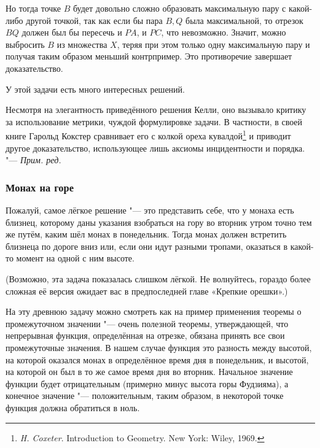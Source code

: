 \documentclass[twoside]{book}
\newenvironment{addedbytheeditors}{\par\medskip\small
}{\par\addvspace{\medskipamount}} %
\begin{document}
Но тогда точке $B$ будет довольно сложно образовать максимальную пару с какой-либо другой точкой, так как если бы пара $B,Q$ была максимальной, то отрезок $BQ$ должен был бы пересечь и $PA$, и $PC$, что невозможно.
Значит, можно выбросить $B$ из множества $X$, теряя при этом только одну максимальную пару и получая таким образом меньший контрпример.
Это противоречие завершает доказательство.\heart

\begin{addedbytheeditors}
У этой задачи есть много интересных решений.


Несмотря на элегантность приведённого решения Келли, оно вызывало
критику за использование метрики, чуждой формулировке задачи.
В
частности, в своей книге Гарольд Кокстер сравнивает его с
колкой ореха кувалдой\footnote{\emph{H. Coxeter}. Introduction to Geometry. New York: Wiley, 1969.}  и приводит другое доказательство,
использующее лишь аксиомы инцидентности и порядка.  "---
\emph{Прим. ред.}
\end{addedbytheeditors}

\subsubsection*{Монах на горе}%

Пожалуй, самое лёгкое решение "--- это представить себе, что у монаха есть близнец, которому даны указания взобраться на гору во вторник утром точно тем же путём, каким шёл монах в понедельник.
Тогда монах должен встретить близнеца по дороге вниз или, если они идут разными тропами, оказаться в какой-то момент на одной с ним высоте.\heart

\medskip

(Возможно, эта задача показалась слишком лёгкой.
Не волнуйтесь, гораздо более сложная её версия ожидает вас в предпоследней главе «Крепкие орешки».)

На эту древнюю задачу можно смотреть как на пример применения теоремы о промежуточном значении "--- очень полезной теоремы, утверждающей, что непрерывная функция, определённая на отрезке, обязана принять все свои промежуточные значения.
В нашем случае функция это разность между высотой, на которой оказался монах в определённое время дня в понедельник, и высотой, на которой он был в то же самое время дня во вторник.
Начальное значение функции будет отрицательным (примерно минус высота горы Фудзияма), а конечное значение "--- положительным, таким образом, в некоторой точке функция должна обратиться в ноль.
\end{document}

